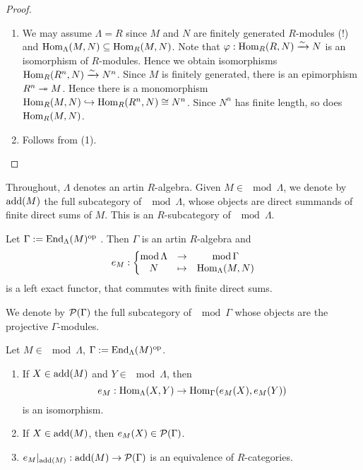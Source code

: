 \begin{proof}\
  \begin{enumerate}
  \item We may assume $\Lambda = R$ since $M$ and $N$ are finitely generated $R$-modules (!) and
    $\operatorname{Hom}_\Lambda(M,N) \subseteq \operatorname{Hom}_R(M,N)$. Note that $\varphi:
    \operatorname{Hom}_R(R,N) \xrightarrow{\sim} N$ is an isomorphism of $R$-modules. Hence we obtain
    isomorphisms $\operatorname{Hom}_R(R^n,N) \xrightarrow{\sim} N^n$. Since $M$ is finitely generated, there
    is an epimorphism $R^n \twoheadrightarrow M$. Hence there is a monomorphism $\operatorname{Hom}_R(M,N) \hookrightarrow
    \operatorname{Hom}_R(R^n,N) \cong N^n$. Since $N^n$  has finite length, so does $\operatorname{Hom}_R(M,N)$.
  \item Follows from (1). \qedhere
  \end{enumerate}
\end{proof}


Throughout, $\Lambda$ denotes an artin $R$-algebra. Given $M \in \mod{\Lambda}$, we denote by
$\operatorname{add}(M)$ the full subcategory of $\mod{\Lambda}$, whose objects are direct summands
of finite direct sums of $M$. This is an $R$-subcategory of $\mod{\Lambda}$.

Let $\Gamma := \operatorname{End}_\Lambda(M)^{\mathrm{op}}$ . Then $\Gamma$ is an artin $R$-algebra and
\[
e_M:
\left\{
\begin{matrix}
\operatorname{mod}{\Lambda} &\to& \operatorname{mod}{\Gamma}\\
N &\mapsto& \operatorname{Hom}_\Lambda(M,N)
\end{matrix}
\right.
\]
is a left exact functor, that commutes with finite direct sums.

We denote by $\mathcal{P}(\Gamma)$ the full subcategory of $\mod{\Gamma}$ whose objects are the
projective $\Gamma$-modules.


\begin{proposition}\label{3.2.2}
  Let $M \in \mod{\Lambda}$, $\Gamma := \operatorname{End}_\Lambda(M)^{\mathrm{op}}$.
  \begin{enumerate}
  \item If $X \in \operatorname{add}(M)$ and $Y \in \mod{\Lambda}$, then
    \[ e_M: \operatorname{Hom}_\Lambda(X,Y) \to \operatorname{Hom}_\Gamma(e_M(X),e_M(Y)) \]
    is an isomorphism.
  \item If $X \in \operatorname{add}(M)$, then $e_M(X) \in \mathcal{P}(\Gamma)$.
  \item ${e_M}|_{\operatorname{add}(M)} : \operatorname{add}(M) \to \mathcal{P}(\Gamma)$ is an equivalence of
    $R$-categories.
  \end{enumerate}
\end{proposition}

